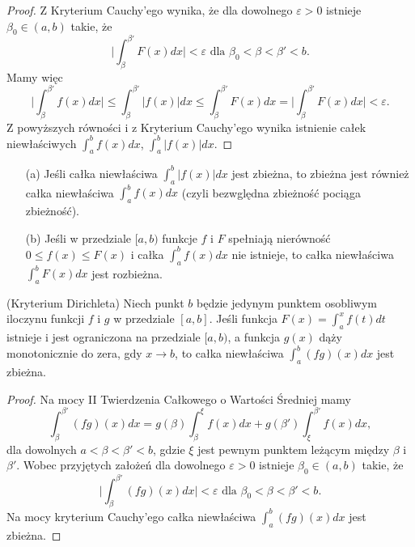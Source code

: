 \documentclass[leqno]{article}
\begin{document}
\begin{justify}
\begin{proof}
Z Kryterium Cauchy'ego wynika, że dla dowolnego $\varepsilon > 0$ istnieje $\beta_0 \in (a,b)$ takie, że
\[
    \Bigg| \int_{\beta}^{\beta'}F(x)dx \Bigg| < \varepsilon \text{ dla } \beta_0 < \beta < \beta' < b.
\]
Mamy więc
\[
    \Bigg| \int_{\beta}^{\beta'}f(x)dx \Bigg| \leqslant \int_{\beta}^{\beta'}\big|f(x)\big|dx \leqslant \int_{\beta}^{\beta'}F(x)dx = \Bigg|\int_{\beta}^{\beta'}F(x)dx\Bigg| < \varepsilon. 
\]
Z powyższych równości i z Kryterium Cauchy'ego wynika istnienie całek niewłaściwych
$\int_{a}^{b}f(x)dx$, $\int_{a}^{b}|f(x)|dx$.

\end{proof}

\begin{wniosek}
{
    \begin{itemize}
        \item [(a)] 
            Jeśli całka niewłaściwa $\int_{a}^{b}|f(x)|dx$ jest zbieżna, to zbieżna jest również całka niewłaściwa
            $\int_{a}^{b}f(x)dx$ (czyli bezwględna zbieżność pociąga zbieżność).
        \item [(b)]
            Jeśli w przedziale $[a,b)$ funkcje $f$ i $F$ spełniają nierówność $0 \leqslant f(x) \leqslant F(x)$ i całka
            $\int_{a}^{b}f(x)dx$ nie istnieje, to całka niewłaściwa $\int_{a}^{b}F(x)dx$ jest rozbieżna. 
    \end{itemize}
}
\end{wniosek}

\begin{theorem}
{
    (Kryterium Dirichleta) Niech punkt $b$ będzie jedynym punktem osobliwym iloczynu funkcji $f$ i $g$ w przedziale $[a,b]$.
    Jeśli funkcja $F(x) = \int_{a}^{x}f(t)dt$ istnieje i jest ograniczona na przedziale $[a,b)$, a funkcja $g(x)$ dąży monotonicznie do zera, gdy 
    $x \to b$, to całka niewłaściwa $\int_{a}^{b}(fg)(x)dx$ jest zbieżna. 
}
\end{theorem}

\begin{proof}
    Na mocy II Twierdzenia Całkowego o Wartości Średniej mamy
    \[
        \int_{\beta}^{\beta'}(fg)(x)dx = g(\beta)\int_{\beta}^{\xi}f(x)dx + g(\beta')\int_{\xi}^{\beta'}f(x)dx,
    \]
    dla dowolnych $a < \beta < \beta' < b$, gdzie $\xi$ jest pewnym punktem leżącym między $\beta$ i $\beta'$.
    Wobec przyjętych założeń dla dowolnego $\varepsilon > 0$ istnieje $\beta_0 \in (a,b)$ takie, że
    \[
        \Bigg|\int_{\beta}^{\beta'}(fg)(x)dx\Bigg| < \varepsilon \text{ dla } \beta_0 < \beta < \beta' < b.
    \]
    Na mocy kryterium Cauchy'ego całka niewłaściwa $\int_{a}^{b}(fg)(x)dx$ jest zbieżna.
\end{proof}


\end{justify}
\end{document}
